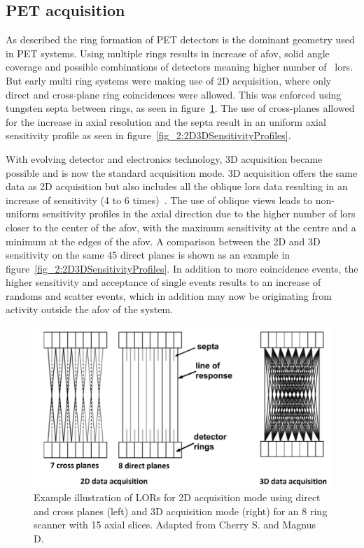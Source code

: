 \subsection{PET acquisition}
As described the ring formation of PET detectors is the dominant geometry used in PET systems. Using multiple rings results in increase of \gls{afov}, solid angle coverage and possible combinations of detectors meaning higher number of ~\glspl{lor}. But early multi ring systems were making use of 2D acquisition, where only direct and cross-plane ring coincidences were allowed. 
This was enforced using tungsten septa between rings, as seen in figure~\ref{fig_2:2D3D}. The use of cross-planes allowed for the increase in axial resolution and the septa result in an uniform axial sensitivity profile as seen in figure~\ref{fig_2:2D3DSensitivityProfiles}.

With evolving detector and electronics technology, 3D acquisition became possible and is now the standard acquisition mode. 3D acquisition offers the same data as 2D acquisition but also includes all the oblique \glspl{lor} data resulting in an increase of sensitivity (4 to 6 times)~\cite{Fahey2002}. The use of oblique views leads to non-uniform sensitivity profiles in the axial direction due to the higher number of \glspl{lor} closer to the center of the \gls{afov}, with the maximum sensitivity at the centre and a minimum at the edges of the \gls{afov}. A comparison between the 2D and 3D sensitivity on the same 45 direct planes is shown as an example in figure~\ref{fig_2:2D3DSensitivityProfiles}.
In addition to more coincidence events, the higher sensitivity and acceptance of single events results to an increase of randoms and scatter events, which in addition may now be originating from activity outside the \gls{afov} of the system. 
%
\begin{figure} [h!]
\centering
\includegraphics[scale=0.40,angle=0]{2_Theory_Methods/figures/Phelps_2D_3D_Acquisition.pdf}
\caption{Example illustration of LORs for 2D acquisition mode using direct and cross planes (left) and 3D  acquisition mode (right) for an 8 ring scanner with 15 axial slices. Adapted from Cherry S. and Magnus D.~\cite{cherry2004pet}} 
\label{fig_2:2D3D}
\end{figure} 

